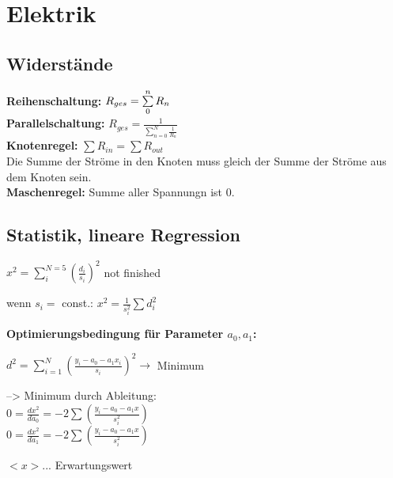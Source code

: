 \documentclass[final, 12pt]{article}
\begin{document}
\section{Elektrik}

\subsection{Widerstände}
\textbf{Reihenschaltung:} $R_{ges} = \sum\limits_{0}^{n} R_n$\\

\textbf{Parallelschaltung:} $R_{ges} = \frac{1}{\sum\limits_{n=0}^{N} \frac{1}{R_n}}$\\

\textbf{Knotenregel:} $\sum R_{in}=\sum R_{out}$\\
Die Summe der Ströme in den Knoten muss gleich der Summe der Ströme aus dem Knoten sein.
\\

\textbf{Maschenregel:} Summe aller Spannungn ist 0. 

\subsection{Statistik, lineare Regression}

$x^2=\sum\limits_{i}^{N=5} \left ( \frac{d_i}{s_i} \right )^2$ not finished

wenn $s_i =$ const.: $x^2 = \frac{1}{s_i^2}\sum d_i^2$

\textbf{Optimierungsbedingung für Parameter $a_0, a_1$:}

$d^2=\sum\limits_{i=1}^{N}\left(\frac{y_i-a_0-a_1x_i}{s_i}\right)^2 \rightarrow $ Minimum

--> Minimum durch Ableitung:\\
$0=\frac{dx^2}{da_0}=-2 \sum\left(\frac{y_i-a_0-a_1x}{s_i^2}\right)$\\
$0=\frac{dx^2}{da_1}=-2 \sum\left(\frac{y_i-a_0-a_1x}{s_i^2}\right)$


$<x>$... Erwartungswert

\newpage
\end{document}
